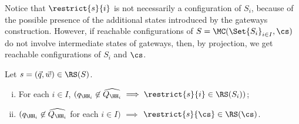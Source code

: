 Notice that $\restrict{s}{i}$ is not necessarily a configuration of $S_i$, because of the possible presence of the additional states introduced by the gateways construction.
However, if reachable configurations of $S=\MC(\Set{S_i}_{i\in I}, \cs)$
do not involve intermediate states of  gateways, 
then, by projection,
we get reachable configurations of  $S_i$ and $\cs$.  

\begin{proposition}
\label{lem:nohatrestrict}
Let $s= (\vec{q},\vec{w}) \in \RS(S)$. %
\begin{enumerate}[i)]
\item
\label{lem:nohatrestrict-a}
 For each $i\in I$, $({q}_{\HH_i}\not\in\widehat{Q_{\HH_i}} \implies 
\restrict{s}{i}\in \RS(S_i))$;
\item
\label{lem:nohatrestrict-b}
$({q}_{\HH_i}\not\in\widehat{Q_{\HH_i}}$ for each $i\in I)$ $\implies$
$\restrict{s}{\cs}\in \RS(\cs)$.
\end{enumerate}
\end{proposition}


